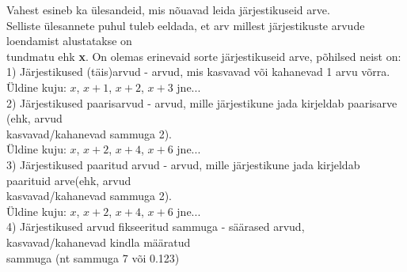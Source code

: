 \begin{center}
{{{\begin{flushleft}
\vspace{2mm}
\hspace{5mm}
Vahest esineb ka ülesandeid, mis nõuavad leida järjestikuseid arve.\\
\hspace{5mm}
Selliste ülesannete puhul tuleb eeldada, et arv millest järjestikuste arvude loendamist alustatakse on\\ \hspace{5mm} tundmatu ehk \textbf{x}. On olemas erinevaid sorte järjestikuseid arve, põhilsed neist on: \\
\vspace{2mm}
\hspace{5mm}
1) Järjestikused  (täis)arvud - arvud, mis kasvavad või kahanevad 1 arvu võrra.\\
\vspace{2mm}
\hspace{10mm}
Üldine kuju: $x$, $x+1$, $x+2$, $x+3$ jne...\\
\vspace{2mm}
\hspace{5mm}
2) Järjestikused paarisarvud - arvud, mille järjestikune jada kirjeldab paarisarve (ehk, arvud\\ \hspace{5mm} kasvavad/kahanevad sammuga 2).\\
\vspace{2mm}
\hspace{10mm}
Üldine kuju: $x$, $x+2$, $x+4$, $x+6$ jne...\\
\vspace{2mm}
\hspace{5mm}
3) Järjestikused paaritud arvud - arvud, mille järjestikune jada kirjeldab paarituid arve(ehk, arvud\\ \hspace{5mm} kasvavad/kahanevad sammuga 2).\\
\vspace{2mm}
\hspace{10mm}
Üldine kuju: $x$, $x+2$, $x+4$, $x+6$ jne...\\
\vspace{2mm}
\hspace{5mm}
4) Järjestikused arvud fikseeritud sammuga - säärased arvud, kasvavad/kahanevad kindla määratud\\ \hspace{5mm} sammuga (nt sammuga 7 või 0.123)\\


\end{flushleft}}}}
\end{center}
